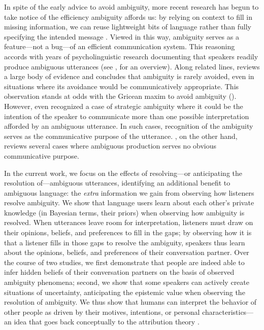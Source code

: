 \documentclass[11pt,a4paper]{article}
\begin{document}
In spite of the early advice to avoid ambiguity, more recent research has begun to take notice of the efficiency ambiguity affords us: by relying on context to fill in missing information, we can reuse lightweight bits of language rather than fully specifying the intended message \cite{levinson2000,piantadosietal2012,wasow2015}. 
Viewed in this way, ambiguity serves as a feature---not a bug---of an efficient communication system.
This reasoning accords with years of psycholinguistic research documenting that speakers readily produce ambiguous utterances (see , for an overview). 
Along related lines,  reviews a large body of evidence and concludes that ambiguity is rarely avoided, even in situations where its avoidance would be communicatively appropriate.
This observation stands at odds with the Gricean maxim to avoid ambiguity ().
However, even \citeauthor{grice1975} recognized a case of strategic ambiguity where it could be the intention of the speaker to communicate more than one possible interpretation afforded by an ambiguous utterance. In such cases, recognition of the ambiguity serves as the communicative purpose of the utterance. , on the other hand, reviews several cases where ambiguous production serves no obvious communicative purpose.


In the current work, we focus on the effects of resolving---or anticipating the resolution of---ambiguous utterances, identifying an additional benefit to ambiguous language: the \emph{extra} information we gain from observing how listeners resolve ambiguity.
We show that language users learn about each other's private knowledge (in Bayesian terms, their priors) when observing how ambiguity is resolved. 
When utterances leave room for interpretation, listeners must draw on their opinions, beliefs, and preferences to fill in the gaps;
by observing how it is that a listener fills in those gaps to resolve the ambiguity, speakers thus learn about the opinions, beliefs, and preferences of their conversation partner. 
Over the course of two studies, we first demonstrate that people are indeed able to infer hidden beliefs of their conversation partners on the basis of observed ambiguity phenomena; second, we show that some speakers can actively create situations of uncertainty, anticipating the epistemic value when observing the resolution of ambiguity. 
We thus show that humans can interpret the behavior of other people as driven by their motives, intentions, or personal characteristics---an idea that goes back conceptually to the attribution theory \cite{jones1965acts, kelley1967attribution, kelley1970social}.
\end{document}

